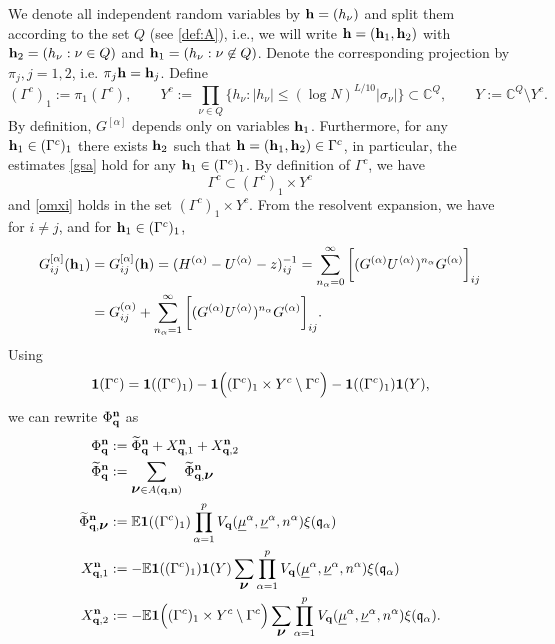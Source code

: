 \documentclass[draft]{article}
\newcommand{\wt}{\widetilde}
\newcommand{\unu}{{\underline {\nu}}}
\newcommand{\umu}{{\underline {\mu}}}
\newcommand{\bq}{{\bf {q}}}
\newcommand{\bh}{{\bf{h}}}
\newcommand{\bn}{{\bf{n}}}
\newcommand{\fq}{{\frak q}}
\newcommand{\sa}{{[\alpha ]}}
\newcommand{\bnu}{\mbox{\boldmath $\nu$}}
\newcommand{\al}{\alpha}
\newcommand{\be}{\begin{equation}}
\newcommand{\ee}{\end{equation}}
\newcommand{\E}{{\mathbb E }}
\newcommand{\C}{{\mathbb C}}
\numberwithin{equation}{section}
\numberwithin{theorem}{section}
\numberwithin{definition}{section}
\numberwithin{remark}{section}
\begin{document}
We denote all independent  random variables by   $\bh = (h_\nu) $
and split them according to the set $Q$ (see \eqref{def:A}), i.e., 
we will write  $\bh= (\bh_1, \bh_2 )$
 with  $\bh_2 = (h_\nu:  \nu \in Q)$ and  $\bh_1 = (h_\nu:  \nu 
\not \in Q)$. Denote the corresponding projection by  $\pi_j, j=1, 2$, i.e.
$\pi_j \bh = \bh_j$.
Define
\be
(\Gamma^c)_1:= \pi_1(\Gamma^c), \qquad
 Y^c:=  \prod_{\nu \in Q} \{ h_\nu: |h_\nu| \le (\log N)^{L/10}
 |\sigma_{\nu}| \} \subset \C^Q, \qquad Y:=  \C^Q\setminus Y^c.
\ee
By definition, $G^{\sa}$ depends only on variables  $ \bh_1$.
 Furthermore, for any $\bh_1 \in (\Gamma^c)_1 $
there exists $\bh_2$ such that $\bh= (\bh_1, \bh_2 ) \in \Gamma^c$,
in particular, the estimates \eqref{gsa} hold for any $\bh_1 \in (\Gamma^c)_1 $.
By definition of $\Gamma^c$, we have 
\be\label{Ycont}
\Gamma^c \subset (\Gamma^c)_1  \times Y^c
\ee
and \eqref{omxi} holds in the set $(\Gamma^c)_1  \times Y^c$.
{F}rom the resolvent expansion, we have for $i \not = j$, 
and for $\bh_1\in (\Gamma^c)_1$,
\begin{align}\label{221}
G^{\sa }_{ij}(\bh_1) & =G^{\sa}_{ij} (\bh)=  
(H^{(\alpha)} - U^{\langle \alpha \rangle } - z)^{-1}_{ij} 
 = \sum_{n_\alpha=0}^\infty  \bigg [ (G^{(\al) }
 U^{\langle \alpha \rangle } )^{n_\alpha}G^{(\alpha) } \bigg ]_{ij}\\
 & =G^{(\al) }_{ij}+  \sum_{n_\alpha=1}^\infty  
\bigg [ (G^{(\al) } U^{\langle \alpha \rangle } )^{n_\alpha}G^{(\alpha) } \bigg ]_{ij}.
\end{align}
Using 
\be\label{y71}
 {\bf 1} (\Gamma^c) =  {\bf 1} ((\Gamma^c)_1) -   
  {\bf 1} \Big( (\Gamma^c)_1 \times Y^c  \setminus \Gamma^c \Big)
  -  {\bf 1} ((\Gamma^c)_1){\bf 1}( Y),
\ee
 we can rewrite $ \Phi_{\bq}^{\bf n}$ as
 \begin{align}\label{2131}
 \Phi_{\bq}^{\bf n}  &:=   \wt  \Phi_{\bq}^{\bf n} +X^\bn_{\bq,1}+X^\bn_{\bq,2}  \\
   \wt \Phi_{\bq}^{\bf n} & :=  \sum_{\bnu\in A(\bq,\bn)} 
 \wt \Phi_{\bq,\bnu}^{\bf n} \nonumber \\
 \wt \Phi_{\bq,\bnu}^{\bf n} & := \E {\bf 1} ((\Gamma^c)_1)    
  \prod_{\alpha=1}^{p}   V_\bq( \umu^\alpha, \unu^\alpha, n^\al)   \xi (\fq_\al)
\label{2111}  \\
X^\bn_{\bq,1}  & :=  - \E {\bf 1}((\Gamma^c)_1)  {\bf 1}(Y) \sum_{ \bnu}  
  \prod_{\alpha=1}^{p}   V_\bq( \umu^\alpha, \unu^\alpha, n^\al)   \xi (\fq_\al)  \\
X^\bn_{\bq,2}& : =  
 -  \E {\bf 1} \Big( (\Gamma^c)_1 \times Y^c  \setminus \Gamma^c \Big)   \sum_{ \bnu}  
  \prod_{\alpha=1}^{p}   V_\bq( \umu^\alpha, \unu^\alpha, n^\al)   \xi (\fq_\al).
\end{align}
\end{document}
